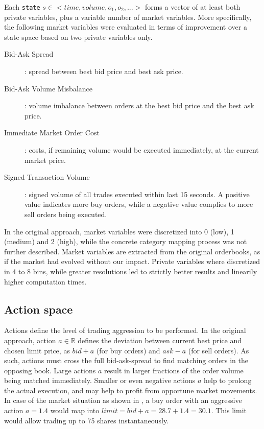 Each \lstinline!state! $s \in <time, volume ,o_1, o_2, ...>$ forms a vector of at least both private variables, plus a variable number of market variables. More specifically, the following market variables were evaluated in terms of improvement over a state space based on two private variables only.
\begin{description}
\item[Bid-Ask Spread]: spread between best bid price and best ask price.
\item[Bid-Ask Volume Misbalance]: volume imbalance between orders at the best bid price and the best ask price.
\item[Immediate Market Order Cost]: costs, if remaining volume would be executed immediately, at the current market price.
\item[Signed Transaction Volume]: signed volume of all trades executed within last 15 seconds. A positive value indicates more buy orders, while a negative value complies to more sell orders being executed.
\end{description}

In the original approach, market variables were discretized into 0 (low), 1 (medium) and 2 (high), while the concrete category mapping process was not further described. Market variables are extracted from the original orderbooks, as if the market had evolved without our impact. Private variables where discretized in 4 to 8 bins, while greater resolutions led to strictly better results and linearily higher computation times.

\subsection{Action space}
\label{chap:actionspace}
Actions define the level of trading aggression to be performed. In the original approach, action $a \in \mathbb{R}$ defines the deviation between current best price and chosen limit price, as $bid + a$ (for buy orders) and $ask - a$ (for sell orders). As such, actions must cross the full bid-ask-spread to find matching orders in the opposing book. Large actions $a$ result in larger fractions of the order volume being matched immediately. Smaller or even negative actions $a$ help to prolong the actual execution, and may help to profit from opportune market movements.\\

In case of the market situation as shown in , a buy order with an aggressive action $a=1.4$ would map into $limit=bid+a=28.7+1.4=30.1$. This limit would allow trading up to 75 shares instantaneously.\\

